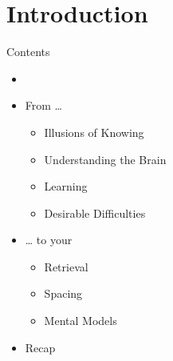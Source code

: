 \documentclass{ercisbeamer}
\begin{document}
\section{Introduction}
\begin{frame}{Contents}
    \begin{itemize}
        \item {}
        \item From …
        \begin{itemize}
            \item Illusions of Knowing
            \item Understanding the Brain
            \item Learning
            \item Desirable Difficulties
        \end{itemize}
        \item … to your 
        \begin{itemize}
            \item Retrieval
            \item Spacing
            \item Mental Models
        \end{itemize}
        \item Recap
    \end{itemize}
\end{frame}
\end{document}
